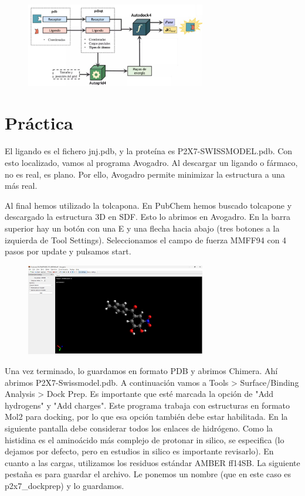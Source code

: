 \begin{figure}[h]
\centering
\includegraphics[width = 0.7\textwidth]{figs/docking-pipeline.png}
\end{figure}

\section{Práctica}
El ligando es el fichero jnj.pdb, y la proteína es P2X7-SWISSMODEL.pdb. Con esto localizado, vamos al programa Avogadro. Al descargar un ligando o fármaco, no es real, es plano. Por ello, Avogadro permite minimizar la estructura a una más real. 

Al final hemos utilizado la tolcapona. En PubChem hemos buscado tolcapone y descargado la estructura 3D en SDF. Esto lo abrimos en Avogadro. En la barra superior hay un botón con una E y una flecha hacia abajo (tres botones a la izquierda de Tool Settings). Seleccionamos el campo de fuerza MMFF94 con 4 pasos por update y pulsamos start. 

\begin{figure}[h]
\centering
\includegraphics[width = 0.7\textwidth]{figs/avogadro-tolcapona.png}
\end{figure}

Una vez terminado, lo guardamos en formato PDB y abrimos Chimera. Ahí abrimos P2X7-Swissmodel.pdb. A continuación vamos a Tools > Surface/Binding Analysis > Dock Prep. Es importante que esté marcada la opción de "Add hydrogens" y "Add charges". Este programa trabaja con estructuras en formato Mol2 para docking, por lo que esa opción también debe estar habilitada. En la siguiente pantalla debe considerar todos los enlaces de hidrógeno. Como la histidina es el aminoácido más complejo de protonar in silico, se especifica (lo dejamos por defecto, pero en estudios in silico es importante revisarlo). En cuanto a las cargas, utilizamos los residuos estándar AMBER ff14SB. La siguiente pestaña es para guardar el archivo. Le ponemos un nombre (que en este caso es p2x7\_dockprep) y lo guardamos.

